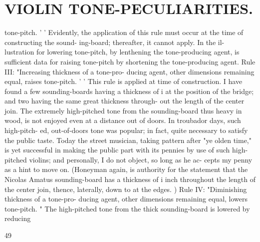 \documentclass{article}
\begin{document}
\section*{VIOLIN TONE-PECULIARITIES.}
tone-pitch. ' ' Evidently, the application of this rule must occur at the time of constructing the sound- ing-board; thereafter, it cannot apply. In the il- lustration for lowering tone-pitch, by lenthening the tone-producing agent, is sufficient data for raising tone-pitch by shortening the tone-producing agent. Rule III: "Increasing thickness of a tone-pro- ducing agent, other dimensions remaining equal, raises tone-pitch. ' ' This rule is applied at time of construction. I have found a few sounding-boards having a thickness of i at the position of the bridge; and two having the same great thickness through- out the length of the center join. The extremely high-pitched tone from the sounding-board thus heavy in wood, is not enjoyed even at a distance out of doors. In troubador days, such high-pitch- ed, out-of-doors tone was popular; in fact, quite necessary to satisfy the public taste. Today the street musician, taking pattern after "ye olden time," is yet successful in making the public part with its pennies by use of such high-pitched violins; and personally, I do not object, so long as he ac- cepts my penny as a hint to move on. (Honeyman again, is authority for the statement that the Nicolas Amatus sounding-board has a thickness of i inch throughout the length of the center join, thence, laterally, down to at the edges. ) Rule IV: "Diminishing thickness of a tone-pro- ducing agent, other dimensions remaining equal, lowers tone-pitch. " The high-pitched tone from the thick sounding-board is lowered by reducing

49
\end{document}
